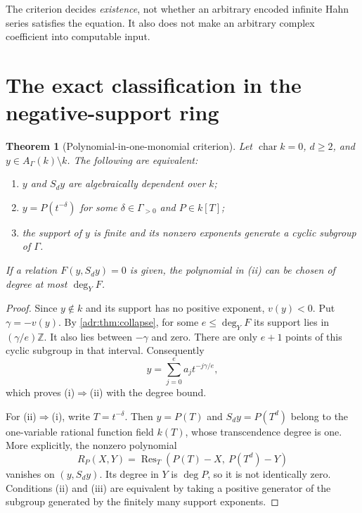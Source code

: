 \documentclass[11pt,letterpaper]{article}
\numberwithin{equation}{section}
\newtheorem{theorem}{Theorem}[section]
\theoremstyle{definition}
\theoremstyle{remark}
\newcommand{\Z}{\mathbb Z}
\newcommand{\A}{A_\Gamma(k)}
\newcommand{\Res}{\operatorname{Res}}
\begin{document}
The criterion decides \emph{existence}, not whether an arbitrary encoded
infinite Hahn series satisfies the equation. It also does not make an
arbitrary complex coefficient into computable input.

\section{The exact classification in the negative-support ring}
\label{adr:sec:negative}

\begin{theorem}[Polynomial-in-one-monomial criterion]
\label{adr:thm:negative}
Let $\operatorname{char}k=0$, $d\ge2$, and $y\in\A\setminus k$.
The following are equivalent:
\begin{enumerate}[label=\textup{(\roman*)},leftmargin=2em,itemsep=2pt]
\item $y$ and $S_dy$ are algebraically dependent over $k$;
\item $y=P(t^{-\delta})$ for some $\delta\in\Gamma_{>0}$ and $P\in k[T]$;
\item the support of $y$ is finite and its nonzero exponents generate a
      cyclic subgroup of $\Gamma$.
\end{enumerate}
If a relation $F(y,S_dy)=0$ is given, the polynomial in \textup{(ii)}
can be chosen of degree at most $\deg_YF$.
\end{theorem}
\begin{proof}
Since $y\notin k$ and its support has no positive exponent, $v(y)<0$.
Put $\gamma=-v(y)$. By \cref{adr:thm:collapse}, for some $e\le\deg_YF$ its
support lies in $(\gamma/e)\Z$. It also lies between $-\gamma$ and zero.
There are only $e+1$ points of this cyclic subgroup in that interval.
Consequently
\[
 y=\sum_{j=0}^e a_jt^{-j\gamma/e},
\]
which proves (i)$\Rightarrow$(ii) with the degree bound.

For (ii)$\Rightarrow$(i), write $T=t^{-\delta}$. Then
$y=P(T)$ and $S_dy=P(T^d)$ belong to the one-variable rational function
field $k(T)$, whose transcendence degree is one. More explicitly, the
nonzero polynomial
\begin{equation}\label{adr:eq:resultant}
 R_P(X,Y)=\Res_T(P(T)-X,\ P(T^d)-Y)
\end{equation}
vanishes on $(y,S_dy)$. Its degree in $Y$ is $\deg P$, so it is not
identically zero. Conditions (ii) and (iii) are equivalent by taking a
positive generator of the subgroup generated by the finitely many support
exponents.
\end{proof}
\end{document}
